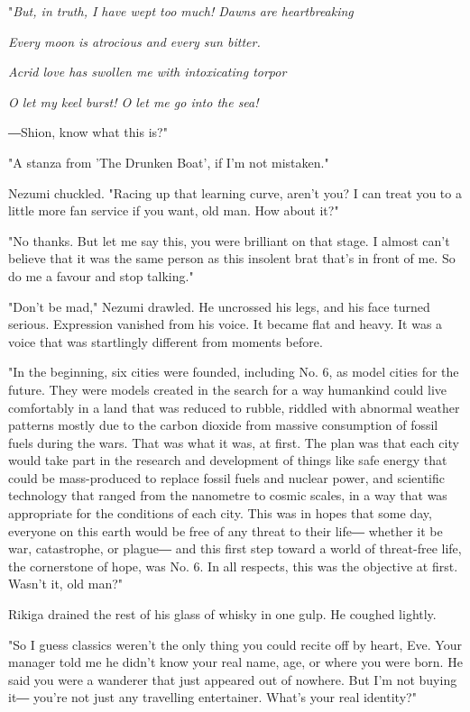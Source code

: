 "\emph{But, in truth, I have wept too much! Dawns are heartbreaking}

\emph{Every moon is atrocious and every sun bitter.}

\emph{Acrid love has swollen me with intoxicating torpor}

\emph{O let my keel burst! O let me go into the sea!~}

―Shion, know what this is?"

"A stanza from 'The Drunken Boat', if I'm not mistaken."

Nezumi chuckled. "Racing up that learning curve, aren't you? I can treat
you to a little more fan service if you want, old man. How about it?"

"No thanks. But let me say this, you were brilliant on that stage. I
almost can't believe that it was the same person as this insolent brat
that's in front of me. So do me a favour and stop talking."

"Don't be mad," Nezumi drawled. He uncrossed his legs, and his face
turned serious. Expression vanished from his voice. It became flat and
heavy. It was a voice that was startlingly different from moments
before.

"In the beginning, six cities were founded, including No. 6, as model
cities for the future. They were models created in the search for a way
humankind could live comfortably in a land that was reduced to rubble,
riddled with abnormal weather patterns mostly due to the carbon dioxide
from massive consumption of fossil fuels during the wars. That was what
it was, at first. The plan was that each city would take part in the
research and development of things like safe energy that could be
mass-produced to replace fossil fuels and nuclear power, and scientific
technology that ranged from the nanometre to cosmic scales, in a way
that was appropriate for the conditions of each city. This was in hopes
that some day, everyone on this earth would be free of any threat to
their life― whether it be war, catastrophe, or plague― and this first
step toward a world of threat-free life, the cornerstone of hope, was
No. 6. In all respects, this was the objective at first. Wasn't it, old
man?"

Rikiga drained the rest of his glass of whisky in one gulp. He coughed
lightly.

"So I guess classics weren't the only thing you could recite off by
heart, Eve. Your manager told me he didn't know your real name, age, or
where you were born. He said you were a wanderer that just appeared out
of nowhere. But I'm not buying it― you're not just any travelling
entertainer. What's your real identity?"

